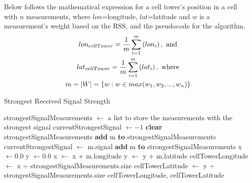\documentclass[a4paper, 12pt]{article}
\begin{document}
Below follows the mathematical expression for a cell tower's position in a cell with $n$ measurements, where $lon$=longitude, $lat$=latitude and $w$ is a measurement's weight based on the RSS, and the pseudocode for the algorithm.
\begin{gather*}
lon_{cellTower}=\frac{1}{m}\sum^{m}_{i=1}\left(lon_i\right), \textnormal{ and}\\ 
lat_{cellTower}=\frac{1}{m}\sum^{m}_{i=1}\left(lat_i\right), \textnormal{ where}\\ 
m = |W| = \{w:w\in max(w_1,w_2,...,w_n)\}
\end{gather*}
\begin{algorithm}
\caption{Strongest Received Signal Strength}
\label{alg:strongestrss}
\begin{algorithmic}[1]
\State strongestSignalMeasurements $\gets$ a list to store the measurements with the strongest signal
\State currentStrongestSignal $\gets -1$
\State \textbf{clear} strongestSignalMeasurements
\State \textbf{add} m \textbf{to} strongestSignalMeasurements
\State currentStrongestSignal $\gets$ m.signal
\State \textbf{add} m \textbf{to} strongestSignalMeasurements
\EndIf
\EndFor
\State x $\gets 0.0$
\State y $\gets 0.0$
\State x $\gets$ x + m.longitude
\State y $\gets$ y + m.latitude
\EndFor
\State cellTowerLongitude $\gets$ x $\div$ strongestSignalMeasurements.size
\State cellTowerLatitude $\gets$ y $\div$ strongestSignalMeasurements.size
\State \Return cellTowerLongitude, cellTowerLatitude
\EndProcedure
\end{algorithmic}
\end{algorithm}

\newpage
\end{document}

